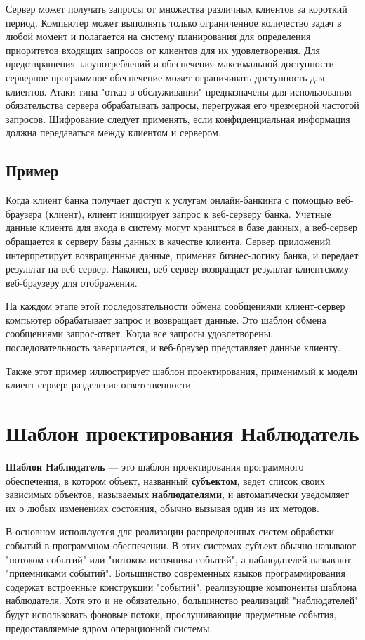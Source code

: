 Сервер может получать запросы от множества различных клиентов за короткий период.
Компьютер может выполнять только ограниченное количество задач в любой момент и полагается на систему планирования для определения приоритетов входящих запросов от клиентов для их удовлетворения.
Для предотвращения злоупотреблений и обеспечения максимальной доступности серверное программное обеспечение может ограничивать доступность для клиентов.
Атаки типа "отказ в обслуживании" предназначены для использования обязательства сервера обрабатывать запросы, перегружая его чрезмерной частотой запросов.
Шифрование следует применять, если конфиденциальная информация должна передаваться между клиентом и сервером.

\subsection{Пример}

Когда клиент банка получает доступ к услугам онлайн-банкинга с помощью веб-браузера (клиент), клиент инициирует запрос к веб-серверу банка.
Учетные данные клиента для входа в систему могут храниться в базе данных, а веб-сервер обращается к серверу базы данных в качестве клиента.
Сервер приложений интерпретирует возвращенные данные, применяя бизнес-логику банка, и передает результат на веб-сервер.
Наконец, веб-сервер возвращает результат клиентскому веб-браузеру для отображения.

На каждом этапе этой последовательности обмена сообщениями клиент-сервер компьютер обрабатывает запрос и возвращает данные.
Это шаблон обмена сообщениями запрос-ответ.
Когда все запросы удовлетворены, последовательность завершается, и веб-браузер представляет данные клиенту.

Также этот пример иллюстрирует шаблон проектирования, применимый к модели клиент-сервер: разделение ответственности.

\newpage
\section{Шаблон проектирования Наблюдатель}

\textbf{Шаблон Наблюдатель} — это шаблон проектирования программного обеспечения, в котором объект, названный \textbf{субъектом}, ведет список своих зависимых объектов, называемых \textbf{наблюдателями}, и автоматически уведомляет их о любых изменениях состояния, обычно вызывая один из их методов.

В основном используется для реализации распределенных систем обработки событий в программном обеспечении.
В этих системах субъект обычно называют "потоком событий" или "потоком источника событий", а наблюдателей называют "приемниками событий".
Большинство современных языков программирования содержат встроенные конструкции "событий", реализующие компоненты шаблона наблюдателя.
Хотя это и не обязательно, большинство реализаций "наблюдателей" будут использовать фоновые потоки, прослушивающие предметные события, предоставляемые ядром операционной системы.

